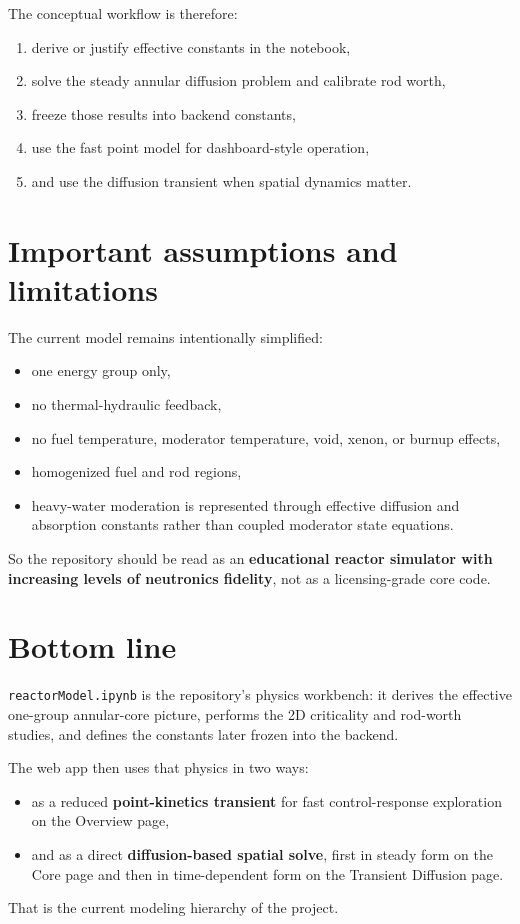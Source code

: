 \documentclass[11pt]{article}
\begin{document}
The conceptual workflow is therefore:
\begin{enumerate}
  \item derive or justify effective constants in the notebook,
  \item solve the steady annular diffusion problem and calibrate rod worth,
  \item freeze those results into backend constants,
  \item use the fast point model for dashboard-style operation,
  \item and use the diffusion transient when spatial dynamics matter.
\end{enumerate}

\section{Important assumptions and limitations}

The current model remains intentionally simplified:
\begin{itemize}
  \item one energy group only,
  \item no thermal-hydraulic feedback,
  \item no fuel temperature, moderator temperature, void, xenon, or burnup effects,
  \item homogenized fuel and rod regions,
  \item heavy-water moderation is represented through effective diffusion and
        absorption constants rather than coupled moderator state equations.
\end{itemize}

So the repository should be read as an \textbf{educational reactor simulator with
increasing levels of neutronics fidelity}, not as a licensing-grade core code.

\section{Bottom line}

\texttt{reactorModel.ipynb} is the repository's physics workbench: it derives the
effective one-group annular-core picture, performs the 2D criticality and
rod-worth studies, and defines the constants later frozen into the backend.

The web app then uses that physics in two ways:
\begin{itemize}
  \item as a reduced \textbf{point-kinetics transient} for fast control-response
        exploration on the Overview page,
  \item and as a direct \textbf{diffusion-based spatial solve}, first in steady
        form on the Core page and then in time-dependent form on the Transient
        Diffusion page.
\end{itemize}

That is the current modeling hierarchy of the project.
\end{document}
